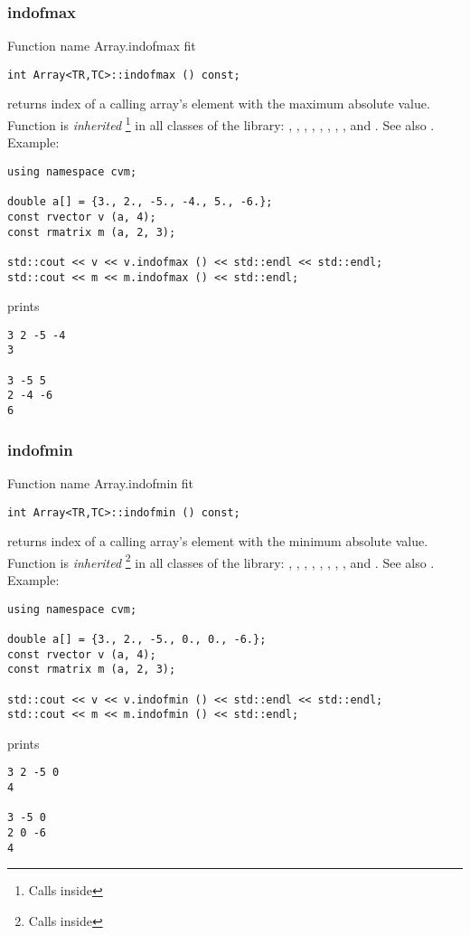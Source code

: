 \subsubsection{indofmax}
Function%
\pdfdest name {Array.indofmax} fit{}
\begin{Verbatim}
int Array<TR,TC>::indofmax () const;
\end{Verbatim}
returns \Based
index of a calling array's element with the maximum
absolute value.
Function is \emph{inherited}%
\footnote{Calls  inside}
in all classes of the library:
,   ,
,   ,
, ,
, ,
 and .
See also .
Example:
\begin{Verbatim}
using namespace cvm;

double a[] = {3., 2., -5., -4., 5., -6.};
const rvector v (a, 4);
const rmatrix m (a, 2, 3);

std::cout << v << v.indofmax () << std::endl << std::endl;
std::cout << m << m.indofmax () << std::endl;
\end{Verbatim}
prints
\begin{Verbatim}
3 2 -5 -4
3

3 -5 5
2 -4 -6
6
\end{Verbatim}
\newpage


\subsubsection{indofmin}
Function%
\pdfdest name {Array.indofmin} fit
\begin{Verbatim}
int Array<TR,TC>::indofmin () const;
\end{Verbatim}
returns  \Based
index of a calling array's element with the minimum
absolute value.
Function is \emph{inherited}%
\footnote{Calls  inside}
in all classes of the library:
,   ,
,   ,
, ,
, ,
 and .
See also .
Example:
\begin{Verbatim}
using namespace cvm;

double a[] = {3., 2., -5., 0., 0., -6.};
const rvector v (a, 4);
const rmatrix m (a, 2, 3);

std::cout << v << v.indofmin () << std::endl << std::endl;
std::cout << m << m.indofmin () << std::endl;
\end{Verbatim}
prints
\begin{Verbatim}
3 2 -5 0
4

3 -5 0
2 0 -6
4
\end{Verbatim}
\newpage


